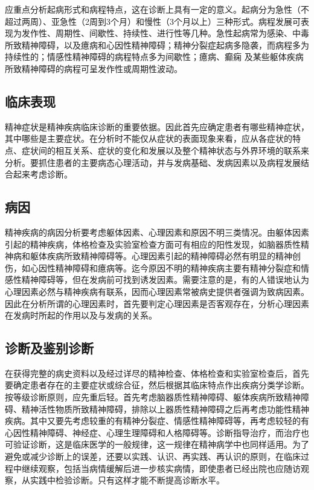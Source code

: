 应重点分析起病形式和病程特点，这在诊断上具有一定的意义。起病分为急性（不超过两周）、亚急性（2周到3个月）和慢性（3个月以上）三种形式。病程发展可表现为发作性、周期性、间歇性、持续性、进行性等几种。急性起病常为感染、中毒所致精神障碍，以及癔病和心因性精神障碍；精神分裂症起病多隐袭，而病程多为持续性的；情感性精神障碍的病程特点多为间歇性；癔病、癫痫
及某些躯体疾病所致精神障碍的病程可呈发作性或周期性波动。

\subsection{临床表现}

精神症状是精神疾病临床诊断的重要依据。因此首先应确定患者有哪些精神症状，其中哪些是主要症状。在分析时不能仅从症状的表面现象来看，应从各症状的特点、症状间的相互关系、症状的变化和发展以及整个精神状态与外界环境的联系来分析。要抓住患者的主要病态心理活动，并与发病基础、发病因素以及病程发展结合起来考虑诊断。

\subsection{病因}

精神疾病的病因分析要考虑躯体因素、心理因素和原因不明三类情况。由躯体因素引起的精神疾病，体格检查及实验室检查方面可有相应的阳性发现，如脑器质性精神病和躯体疾病所致精神障碍等。心理因素引起的精神障碍必然有明显的精神创伤，如心因性精神障碍和癔病等。迄今原因不明的精神疾病主要有精神分裂症和情感性精神障碍等，但在发病前可找到诱发因素。需要注意的是，有的人错误地认为心理因素必然与精神疾病有联系，因而心理因素常被病史提供者强调为致病因素。因此在分析所谓的心理因素时，首先要判定心理因素是否客观存在，分析心理因素在发病时所起的作用以及与发病的关系。

\subsection{诊断及鉴别诊断}

在获得完整的病史资料以及经过详尽的精神检查、体格检查和实验室检查后，首先要确定患者存在的主要症状或综合征，然后根据其临床特点作出疾病分类学诊断。按等级诊断原则，应先重后轻。首先考虑脑器质性精神障碍、躯体疾病所致精神障碍、精神活性物质所致精神障碍，排除以上器质性精神障碍之后再考虑功能性精神疾病。其中又要先考虑较重的有精神分裂症、情感性精神障碍等，再考虑较轻的有心因性精神障碍、神经症、心理生理障碍和人格障碍等。诊断指导治疗，而治疗也可验证诊断，这是临床医学的一般规律，这一规律在精神病学中也同样适用。为了避免或减少诊断上的误差，还要以实践、认识、再实践、再认识的原则，在临床过程中继续观察，包括当病情缓解后进一步核实病情，即使患者已经出院也应随访观察，从实践中检验诊断。只有这样才能不断提高诊断水平。


